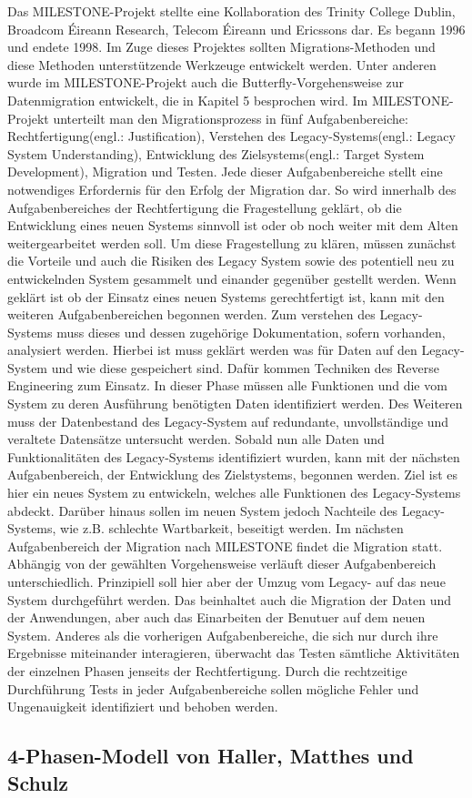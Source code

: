 Das MILESTONE-Projekt stellte eine Kollaboration des Trinity College Dublin, Broadcom Éireann Research, Telecom Éireann und Ericssons dar. Es begann 1996 und endete 1998. Im Zuge dieses Projektes sollten Migrations-Methoden und diese Methoden unterstützende Werkzeuge entwickelt werden.\cite[S. 3]{wuLawless-1997} Unter anderen wurde im MILESTONE-Projekt auch die Butterfly-Vorgehensweise zur Datenmigration entwickelt, die in Kapitel 5 besprochen wird.\cite[S. 3]{wuLawless-1997} 
\lb
Im MILESTONE-Projekt unterteilt man den Migrationsprozess in fünf Aufgabenbereiche: Rechtfertigung(engl.: Justification), Verstehen des Legacy-Systems(engl.: Legacy System Understanding), Entwicklung des Zielsystems(engl.: Target System Development), Migration und Testen.\cite[S. 3]{wuLawless-1997} Jede dieser Aufgabenbereiche stellt eine notwendiges Erfordernis für den Erfolg der Migration dar. So wird innerhalb des Aufgabenbereiches der Rechtfertigung die Fragestellung geklärt, ob die Entwicklung eines neuen Systems sinnvoll ist oder ob noch weiter mit dem Alten weitergearbeitet werden soll. Um diese Fragestellung zu klären, müssen zunächst die Vorteile und auch die Risiken des Legacy System sowie des potentiell neu zu entwickelnden System gesammelt und einander gegenüber gestellt werden.\cite[S. 3]{wuLawless-1997}
\lb
Wenn geklärt ist ob der Einsatz eines neuen Systems gerechtfertigt ist, kann mit den weiteren Aufgabenbereichen begonnen werden. Zum verstehen des Legacy-Systems muss dieses und dessen zugehörige Dokumentation, sofern vorhanden, analysiert werden.\cite[S. 3f]{wuLawless-1997} Hierbei ist muss geklärt werden was für Daten auf den Legacy-System und wie diese gespeichert sind. Dafür kommen Techniken des Reverse Engineering zum Einsatz.\cite[S. 3f]{wuLawless-1997} In dieser Phase müssen alle Funktionen und die vom System zu deren Ausführung benötigten Daten identifiziert werden. Des Weiteren muss der Datenbestand des Legacy-System auf redundante, unvollständige und veraltete Datensätze untersucht werden.\cite[S. 3f]{wuLawless-1997}
\lb
Sobald nun alle Daten und Funktionalitäten des Legacy-Systems identifiziert wurden, kann mit der nächsten Aufgabenbereich, der Entwicklung des Zielstystems, begonnen werden. Ziel ist es hier ein neues System zu entwickeln, welches alle Funktionen des Legacy-Systems abdeckt. Darüber hinaus sollen im neuen System jedoch Nachteile des Legacy-Systems, wie z.B. schlechte Wartbarkeit, beseitigt werden.\cite[S. 3ff]{wuLawless-1997} 
\lb
Im nächsten Aufgabenbereich der Migration nach MILESTONE findet die Migration statt. Abhängig von der gewählten Vorgehensweise verläuft dieser Aufgabenbereich unterschiedlich. Prinzipiell soll hier aber der Umzug vom Legacy- auf das neue System durchgeführt werden. Das beinhaltet auch die Migration der Daten und der Anwendungen, aber auch das Einarbeiten der Benutuer auf dem neuen System.\cite[S. 3ff]{wuLawless-1997}
\lb
Anderes als die vorherigen Aufgabenbereiche, die sich nur durch ihre Ergebnisse miteinander interagieren, überwacht das Testen sämtliche Aktivitäten der einzelnen Phasen jenseits der Rechtfertigung. Durch die rechtzeitige Durchführung Tests in jeder Aufgabenbereiche sollen mögliche Fehler und Ungenauigkeit identifiziert  und behoben werden.\cite[S. 3f]{wuLawless-1997}


\subsection{4-Phasen-Modell von Haller, Matthes und Schulz}